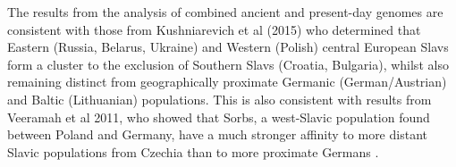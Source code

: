 The results from the analysis of combined ancient and present-day genomes are consistent with those from Kushniarevich et al (2015) \cite{Kushniarevich23015} who determined that Eastern (Russia, Belarus, Ukraine) and Western (Polish) central European Slavs form a cluster to the exclusion of Southern Slavs (Croatia, Bulgaria), whilst also remaining distinct from geographically proximate Germanic (German/Austrian) and Baltic (Lithuanian) populations. This is also consistent with results from Veeramah et al 2011, who showed that Sorbs, a west-Slavic population found between Poland and Germany, have a much stronger affinity to more distant Slavic populations from Czechia than to more proximate Germans \cite{veeramah2011genetic}. 

